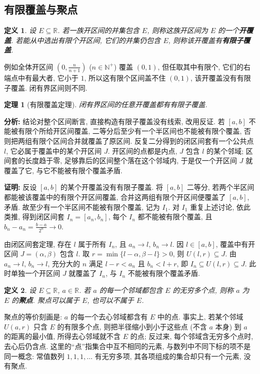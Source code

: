 \documentclass[UTF8,openany]{ctexbook}
\theoremstyle{chinesetextbook}
\newtheorem{definition}{定义}[section]
\newtheorem{theorem}{定理}[section]
\newenvironment{cnproof}{\par\indent\textbf{证明:} \ignorespaces}{\par}
\begin{document}
\subsection{有限覆盖与聚点}
\begin{definition}
设 $E\subseteq\mathbb R$. 若一族开区间的并集包含 $E$, 则称这族开区间为 $E$ 的一个\textbf{开覆盖}. 若能从中选出有限个开区间, 它们的并集仍包含 $E$, 则称该开覆盖有\textbf{有限子覆盖}.
\end{definition}
例如全体开区间 $\displaystyle\left(0,\frac n{n+1}\right)$ ($n\in\mathbb N^+$) 覆盖 $(0,1)$, 但任取其中有限个, 它们的右端点中有最大者, 它小于 $1$, 所以这有限个区间盖不住 $(0,1)$, 该开覆盖没有有限子覆盖. 闭有界区间则不同.
\begin{theorem}[有限覆盖定理]
闭有界区间的任意开覆盖都有有限子覆盖.
\end{theorem}
\par\indent\textbf{分析:} 结论对整个区间断言, 直接构造有限子覆盖没有线索, 改用反证. 若 $[a,b]$ 不能被有限个所给开区间覆盖, 二等分后至少有一个半区间也不能被有限个覆盖, 否则把两组有限个区间合并就覆盖了原区间. 反复二分得到的闭区间套有一个公共点 $l$, 它必属于覆盖中的某个开区间 $J$. 开区间的点都是内点, $J$ 包含 $l$ 的某个邻域; 区间套的长度趋于零, 足够靠后的区间整个落在这个邻域内, 于是仅一个开区间 $J$ 就覆盖了它, 与它不能被有限个覆盖矛盾.
\begin{cnproof}
反设 $[a,b]$ 的某个开覆盖没有有限子覆盖. 将 $[a,b]$ 二等分, 若两个半区间都能被该覆盖中的有限个开区间覆盖, 合并这两组有限个开区间便覆盖了 $[a,b]$, 矛盾. 故至少有一个半区间不能被有限个覆盖, 记为 $I_1$. 对 $I_1$ 重复上述讨论, 依此类推, 得到闭区间套 $I_n=[a_n,b_n]$, 每个 $I_n$ 都不能被有限个覆盖, 且 $\displaystyle b_n-a_n=\frac{b-a}{2^n}\to0$.

由闭区间套定理, 存在 $l$ 属于所有 $I_n$, 且 $a_n\to l$, $b_n\to l$. 因 $l\in[a,b]$, 覆盖中有开区间 $J=(\alpha,\beta)$ 包含 $l$. 取 $r=\min\{l-\alpha,\beta-l\}>0$, 则 $U(l,r)\subseteq J$. 由 $a_n\to l$, $b_n\to l$, 充分大的 $n$ 满足 $l-r<a_n$ 且 $b_n<l+r$, 即 $I_n\subseteq U(l,r)\subseteq J$. 此时单独一个开区间 $J$ 就覆盖了 $I_n$, 与 $I_n$ 不能被有限个覆盖矛盾.
\end{cnproof}
\begin{definition}
设 $E\subseteq\mathbb R$, $a\in\mathbb R$. 若 $a$ 的每一个邻域都包含 $E$ 的无穷多个点, 则称 $a$ 为 $E$ 的\textbf{聚点}. 聚点可以属于 $E$, 也可以不属于 $E$.
\end{definition}
聚点的等价刻画是: $a$ 的每一个去心邻域都含有 $E$ 中的点. 事实上, 若某个邻域 $U(a,r)$ 只含 $E$ 的有限多个点, 则把半径缩小到小于这些点 (不含 $a$ 本身) 到 $a$ 的距离的最小值, 所得去心邻域就不含 $E$ 的点; 反过来, 每个邻域含无穷多个点时, 去心后仍含点. 这里的“点”指集合中互不相同的元素, 与数列中不同下标的项不是同一概念: 常值数列 $1,1,1,\ldots$ 有无穷多项, 其各项组成的集合却只有一个元素, 没有聚点.
\end{document}

